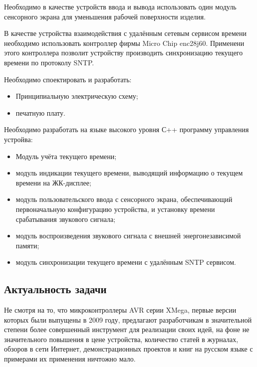 \begin{par}
Необходимо в качестве устройств ввода и вывода использовать один модуль сенсорного экрана
для уменьшения рабочей поверхности изделия.
\end{par}

\begin{par}
В качестве устройства взаимодействия с удалённым сетевым сервисом времени необходимо использовать
контроллер фирмы Micro Chip enc28j60. Применени этого контроллера позволит устройству производить
синхронизацию текущего времени по протоколу SNTP.
\end{par}

\begin{par}
Необходимо споектировать и разработать:
    \begin{itemize}
        \item{}Принципиальную электрическую схему;
        \item{}печатную плату.
    \end{itemize}
\end{par}

\begin{par}
Необходимо разработать на языке высокого уровня С++  программу управления устройва:
\begin{itemize}
    \item{} Модуль учёта текущего времени;
    \item{} модуль индикации текущего времени, выводящий информацию о текущем времени на ЖК-дисплее;
    \item{} модуль пользовательского ввода с сенсорного экрана, обеспечивающий первоначальную
            конфигурацию устройства, и установку времени срабатывания звукового сигнала;
    \item{} модуль воспроизведения звукового сигнала с внешней энергонезависимой памяти;
    \item{} модуль синхронизации текущего времени с удалённым SNTP сервисом.
\end{itemize}
\end{par}

\subsection{Актуальность задачи}
\begin{par}
Не смотря на то, что микроконтроллеры AVR серии XMega, первые версии которых были выпущены в 2009 году,
предлагают разработчикам в значительной степени более совершенный инструмент для
реализации своих идей, на фоне не значительного повышения в цене устройства, количество статей в журналах,
обзоров в сети Интернет, демонстрационных проектов и книг на русском языке с примерами их применения
ничтожно мало.
\end{par}

